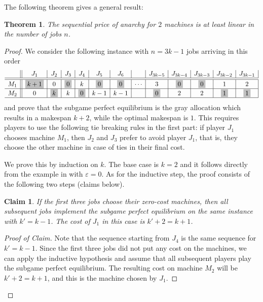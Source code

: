 \documentclass[12pt,a4paper]{article}
\newtheorem{theorem}[lemma]{Theorem}
\newtheorem{claim}[lemma]{Claim}
\theoremstyle{definition}
\theoremstyle{remark}
\newcommand{\take}[1]{\colorbox{emphcol}{$#1$}}
\renewcommand{\epsilon}{\varepsilon}
\begin{document}
The following theorem gives a general result:

\begin{theorem}
\label{counterexample}
The sequential price of anarchy for $2$ machines is at least linear in the number of jobs $n$. 
\end{theorem}

\begin{proof}
We consider the following instance with $n=3k-1$ jobs arriving in this order
%
\[\begin{array}{c||c|c|c|c|c|c|c|c|c|c|c|c|}
& J_1 & J_2 & J_3 & J_4 & J_5 & J_6 &  & J_{3k-5} & J_{3k-4} & J_{3k-3} & J_{3k-2} & J_{3k-1} \\ \hline\hline
M_1 & \take{k+1} & 0 & \take{0} & k & \take{0} & \take{0} & \cdots & 3 & \take{0} & \take{0} & 1 & 2 \\ \hline
M_2 & 0 & \take{k} & k & \take{0} & k-1 & k-1 &  & \take{0} & 2 & 2 & \take{1} &  \take{1} \\ \hline
\end{array}
\]
and prove that the subgame perfect equilibrium is the gray allocation which results in a makespan $k+2$, while the optimal makespan is $1$. This requires players to use the following tie breaking rules in the first part: if player $J_1$ chooses machine $M_1$, then $J_2$ and $J_3$ prefer to avoid player $J_1$, that is, they choose the other machine in case of ties in their final cost. 


We prove this by induction on $k$. The base case is $k=2$ and it follows directly from the example in  with $\epsilon=0$. As for the inductive step, the proof consists of the following two steps (claims below).

\begin{claim}
	If the first three jobs choose their zero-cost machines, then all subsequent jobs implement the subgame perfect equilibrium on the same instance with $k'=k-1$. The cost of $J_1$ in this case is $k'+2=k+1$.
\end{claim}
\begin{proof}[Proof of Claim]
	Note that the sequence starting from $J_4$ is the same sequence for $k' =k-1$. Since the first three jobs did not put any cost on the machines, we can apply the inductive hypothesis and assume that all subsequent players play the subgame perfect equilibrium. The resulting cost on machine $M_2$ will be $k'+2=k+1$, and this is the machine chosen by $J_1$.
\end{proof}


\end{proof}
\end{document}

